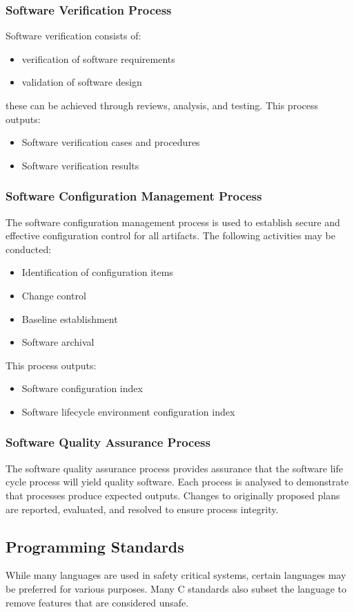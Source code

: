\documentclass{article}
\begin{document}
\subsubsection{Software Verification Process}
Software verification consists of:
\begin{itemize}
    \item verification of software requirements
    \item validation of software design
\end{itemize}
these can be achieved through reviews, analysis, and testing.
This process outputs:
\begin{itemize}
    \item Software verification cases and procedures
    \item Software verification results
\end{itemize}
\subsubsection{Software Configuration Management Process}
The software configuration management process is used to establish
secure and effective configuration control for all artifacts. The
following activities may be conducted:
\begin{itemize}
    \item Identification of configuration items
    \item Change control
    \item Baseline establishment
    \item Software archival
\end{itemize}
This process outputs:
\begin{itemize}
    \item Software configuration index
    \item Software lifecycle environment configuration index
\end{itemize}
\subsubsection{Software Quality Assurance Process}
The software quality assurance process provides assurance that the
software life cycle process will yield quality software. Each process
is analysed to demonstrate that processes produce expected outputs.
Changes to originally proposed plans are reported, evaluated, and
resolved to ensure process integrity.
\subsection{Programming Standards}
While many languages are used in safety critical systems, certain
languages may be preferred for various purposes. Many C standards also
subset the language to remove features that are considered unsafe.
\end{document}
